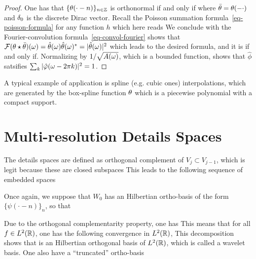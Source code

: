 
\begin{proof}
	One has that $\{\theta(\cdot-n)\}_{n \in \mathbb{Z}}$ is orthonormal if and only if 
	where $\bar{\theta}=\theta(-\cdot)$ and $\delta_0$ is the discrete Dirac vector. 
	Recall the Poisson summation formula~\eqref{eq-poisson-formula} for any function $h$ 
	which here reads
	We conclude with the Fourier-convolution formula~\eqref{eq-convol-fourier} shows that $\mathcal{F}(\theta \star \bar{\theta})(\omega)=\hat{\theta}(\omega)\hat{\theta}(\omega)^*=|\hat{\theta}(\omega)|^2$ which leads to the desired formula, and it is if and only if. 
	Normalizing by $1/\sqrt{A(\omega)}$, which is a bounded function, shows that $\hat\phi$ satsifies $\sum_{k} |\hat {\varphi}(\omega-2\pi k)|^2 = 1$.
\end{proof}

A typical example of application is spline (e.g. cubic ones) interpolations, which are generated by the box-spline function $\theta$ which is a piecewise polynomial with a compact support. 

\section{Multi-resolution Details Spaces}

The details spaces are defined as orthogonal complement of $V_j \subset V_{j-1}$, which is legit because these are closed subspaces
This leads to the following sequence of embedded spaces
\begin{center}
\end{center}
Once again, we suppose that $W_0$ has an Hilbertian ortho-basis of the form $\{\psi(\cdot-n)\}_n$, so that 

Due to the orthogonal complementarity property, one has
This means that for all $f \in L^2(\mathbb{R})$, one has the following convergence in $L^2(\mathbb{R})$, 
This decomposition shows that 
is an Hilbertian orthogonal basis of $L^2(\mathbb{R})$, which is called a wavelet basis.
%
One also have a ``truncated'' ortho-basis 

